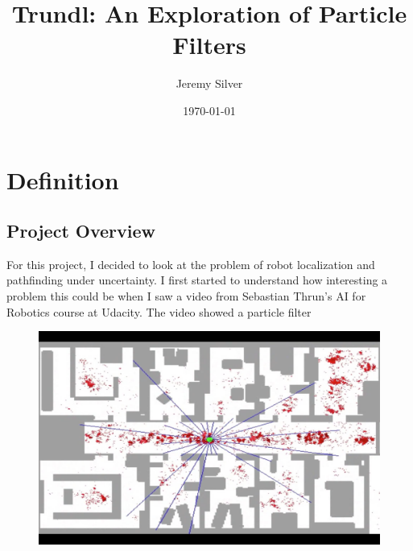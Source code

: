 \documentclass[letterpaper]{article}
\title{Trundl: An Exploration of Particle Filters}
\author{Jeremy Silver}
\date{\today}
\begin{document}
\maketitle

\abstract{}



\section{Definition}

\subsection{Project Overview}

For this project, I decided to look at the problem of robot localization and pathfinding under uncertainty. I first started to understand how interesting a problem this could be when I saw a video from Sebastian Thrun's AI for Robotics course at Udacity. The video showed a particle filter 


\begin{figure}\label{fig:localization-example}
\includegraphics[width=.5\linewidth]{images/localization-example.png}



\end{figure}







{}

\end{document}
